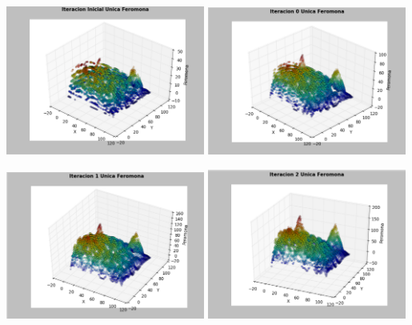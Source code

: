 \begin{center}
\includegraphics[width=0.49\textwidth]{imagenes/iter-1}
\includegraphics[width=0.49\textwidth]{imagenes/iter0}
\end{center}
\begin{center}
\includegraphics[width=0.49\textwidth]{imagenes/iter1}
\includegraphics[width=0.49\textwidth]{imagenes/iter2}
\end{center}
